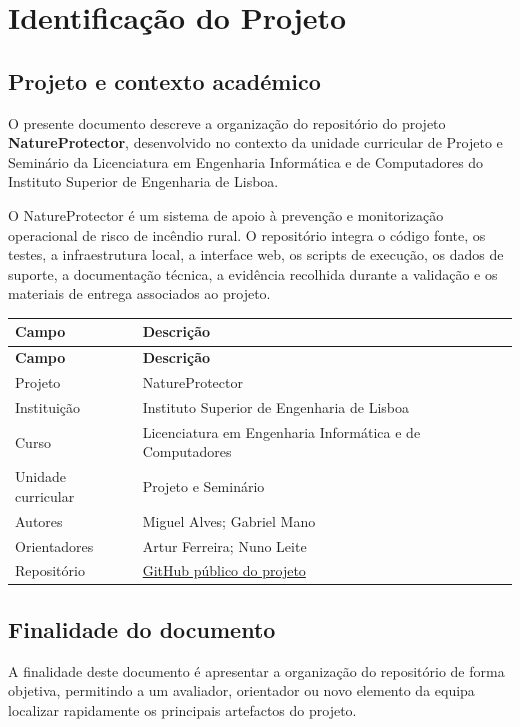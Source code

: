 \section{Identificação do Projeto}

\subsection{Projeto e contexto académico}

O presente documento descreve a organização do repositório do projeto \textbf{NatureProtector}, desenvolvido no contexto da unidade curricular de Projeto e Seminário da Licenciatura em Engenharia Informática e de Computadores do Instituto Superior de Engenharia de Lisboa.

O NatureProtector é um sistema de apoio à prevenção e monitorização operacional de risco de incêndio rural. O repositório integra o código fonte, os testes, a infraestrutura local, a interface web, os scripts de execução, os dados de suporte, a documentação técnica, a evidência recolhida durante a validação e os materiais de entrega associados ao projeto.

\begin{longtable}{L{0.30\textwidth} L{0.60\textwidth}}
\toprule
\textbf{Campo} & \textbf{Descrição} \\
\midrule
\endfirsthead
\toprule
\textbf{Campo} & \textbf{Descrição} \\
\midrule
\endhead
Projeto & NatureProtector \\
Instituição & Instituto Superior de Engenharia de Lisboa \\
Curso & Licenciatura em Engenharia Informática e de Computadores \\
Unidade curricular & Projeto e Seminário \\
Autores & Miguel Alves; Gabriel Mano \\
Orientadores & Artur Ferreira; Nuno Leite \\
Repositório & \href{https://github.com/MAlves4018/NatureProtector.git}{GitHub público do projeto} \\
\bottomrule
\end{longtable}

\subsection{Finalidade do documento}

A finalidade deste documento é apresentar a organização do repositório de forma objetiva, permitindo a um avaliador, orientador ou novo elemento da equipa localizar rapidamente os principais artefactos do projeto.


